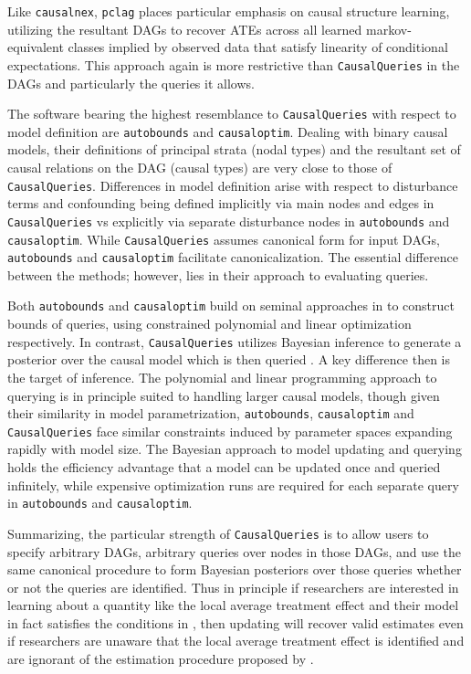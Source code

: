 \documentclass[
  11pt,
  article]{jss}
\begin{document}
Like \texttt{causalnex}, \texttt{pclag} places particular emphasis on
causal structure learning, utilizing the resultant DAGs to recover ATEs
across all learned markov-equivalent classes implied by observed data
that satisfy linearity of conditional expectations. This approach again
is more restrictive than \texttt{CausalQueries} in the DAGs and
particularly the queries it allows.

The software bearing the highest resemblance to \texttt{CausalQueries}
with respect to model definition are \texttt{autobounds} and
\texttt{causaloptim}. Dealing with binary causal models, their
definitions of principal strata (nodal types) and the resultant set of
causal relations on the DAG (causal types) are very close to those of
\texttt{CausalQueries}. Differences in model definition arise with
respect to disturbance terms and confounding being defined implicitly
via main nodes and edges in \texttt{CausalQueries} vs explicitly via
separate disturbance nodes in \texttt{autobounds} and
\texttt{causaloptim}. While \texttt{CausalQueries} assumes canonical
form for input DAGs, \texttt{autobounds} and \texttt{causaloptim}
facilitate canonicalization. The essential difference between the
methods; however, lies in their approach to evaluating queries.

Both \texttt{autobounds} and \texttt{causaloptim} build on seminal
approaches in \citet{balke_bounds_1997} to construct bounds of queries,
using constrained polynomial and linear optimization respectively. In
contrast, \texttt{CausalQueries} utilizes Bayesian inference to generate
a posterior over the causal model which is then queried
\citep[consistent
with][]{chickering_clinicians_1996, zhang_partial_2022}. A key
difference then is the target of inference. The polynomial and linear
programming approach to querying is in principle suited to handling
larger causal models, though given their similarity in model
parametrization, \texttt{autobounds}, \texttt{causaloptim} and
\texttt{CausalQueries} face similar constraints induced by parameter
spaces expanding rapidly with model size. The Bayesian approach to model
updating and querying holds the efficiency advantage that a model can be
updated once and queried infinitely, while expensive optimization runs
are required for each separate query in \texttt{autobounds} and
\texttt{causaloptim}.

Summarizing, the particular strength of \texttt{CausalQueries} is to
allow users to specify arbitrary DAGs, arbitrary queries over nodes in
those DAGs, and use the same canonical procedure to form Bayesian
posteriors over those queries whether or not the queries are identified.
Thus in principle if researchers are interested in learning about a
quantity like the local average treatment effect and their model in fact
satisfies the conditions in \citet{angrist_identification_1996}, then
updating will recover valid estimates even if researchers are unaware
that the local average treatment effect is identified and are ignorant
of the estimation procedure proposed by
\citet{angrist_identification_1996}.
\end{document}
